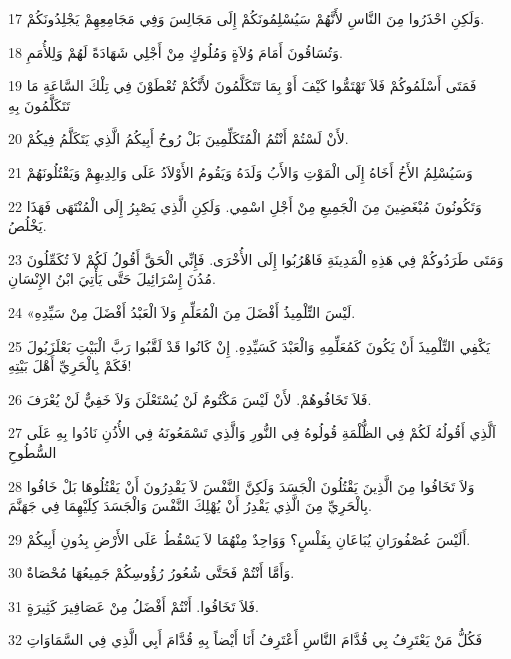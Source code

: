 \par 17 وَلَكِنِ احْذَرُوا مِنَ النَّاسِ لأَنَّهُمْ سَيُسْلِمُونَكُمْ إِلَى مَجَالِسَ وَفِي مَجَامِعِهِمْ يَجْلِدُونَكُمْ.
\par 18 وَتُسَاقُونَ أَمَامَ وُلاَةٍ وَمُلُوكٍ مِنْ أَجْلِي شَهَادَةً لَهُمْ وَلِلأُمَمِ.
\par 19 فَمَتَى أَسْلَمُوكُمْ فَلاَ تَهْتَمُّوا كَيْفَ أَوْ بِمَا تَتَكَلَّمُونَ لأَنَّكُمْ تُعْطَوْنَ فِي تِلْكَ السَّاعَةِ مَا تَتَكَلَّمُونَ بِهِ
\par 20 لأَنْ لَسْتُمْ أَنْتُمُ الْمُتَكَلِّمِينَ بَلْ رُوحُ أَبِيكُمُ الَّذِي يَتَكَلَّمُ فِيكُمْ.
\par 21 وَسَيُسْلِمُ الأَخُ أَخَاهُ إِلَى الْمَوْتِ وَالأَبُ وَلَدَهُ وَيَقُومُ الأَوْلاَدُ عَلَى وَالِدِيهِمْ وَيَقْتُلُونَهُمْ
\par 22 وَتَكُونُونَ مُبْغَضِينَ مِنَ الْجَمِيعِ مِنْ أَجْلِ اسْمِي. وَلَكِنِ الَّذِي يَصْبِرُ إِلَى الْمُنْتَهَى فَهَذَا يَخْلُصُ.
\par 23 وَمَتَى طَرَدُوكُمْ فِي هَذِهِ الْمَدِينَةِ فَاهْرُبُوا إِلَى الأُخْرَى. فَإِنِّي الْحَقَّ أَقُولُ لَكُمْ لاَ تُكَمِّلُونَ مُدُنَ إِسْرَائِيلَ حَتَّى يَأْتِيَ ابْنُ الإِنْسَانِ.
\par 24 «لَيْسَ التِّلْمِيذُ أَفْضَلَ مِنَ الْمُعَلِّمِ وَلاَ الْعَبْدُ أَفْضَلَ مِنْ سَيِّدِهِ.
\par 25 يَكْفِي التِّلْمِيذَ أَنْ يَكُونَ كَمُعَلِّمِهِ وَالْعَبْدَ كَسَيِّدِهِ. إِنْ كَانُوا قَدْ لَقَّبُوا رَبَّ الْبَيْتِ بَعْلَزَبُولَ فَكَمْ بِالْحَرِيِّ أَهْلَ بَيْتِهِ!
\par 26 فَلاَ تَخَافُوهُمْ. لأَنْ لَيْسَ مَكْتُومٌ لَنْ يُسْتَعْلَنَ وَلاَ خَفِيٌّ لَنْ يُعْرَفَ.
\par 27 اَلَّذِي أَقُولُهُ لَكُمْ فِي الظُّلْمَةِ قُولُوهُ فِي النُّورِ وَالَّذِي تَسْمَعُونَهُ فِي الأُذُنِ نَادُوا بِهِ عَلَى السُّطُوحِ
\par 28 وَلاَ تَخَافُوا مِنَ الَّذِينَ يَقْتُلُونَ الْجَسَدَ وَلَكِنَّ النَّفْسَ لاَ يَقْدِرُونَ أَنْ يَقْتُلُوهَا بَلْ خَافُوا بِالْحَرِيِّ مِنَ الَّذِي يَقْدِرُ أَنْ يُهْلِكَ النَّفْسَ وَالْجَسَدَ كِلَيْهِمَا فِي جَهَنَّمَ.
\par 29 أَلَيْسَ عُصْفُورَانِ يُبَاعَانِ بِفَلْسٍ؟ وَوَاحِدٌ مِنْهُمَا لاَ يَسْقُطُ عَلَى الأَرْضِ بِدُونِ أَبِيكُمْ.
\par 30 وَأَمَّا أَنْتُمْ فَحَتَّى شُعُورُ رُؤُوسِكُمْ جَمِيعُهَا مُحْصَاةٌ.
\par 31 فَلاَ تَخَافُوا. أَنْتُمْ أَفْضَلُ مِنْ عَصَافِيرَ كَثِيرَةٍ.
\par 32 فَكُلُّ مَنْ يَعْتَرِفُ بِي قُدَّامَ النَّاسِ أَعْتَرِفُ أَنَا أَيْضاً بِهِ قُدَّامَ أَبِي الَّذِي فِي السَّمَاوَاتِ
